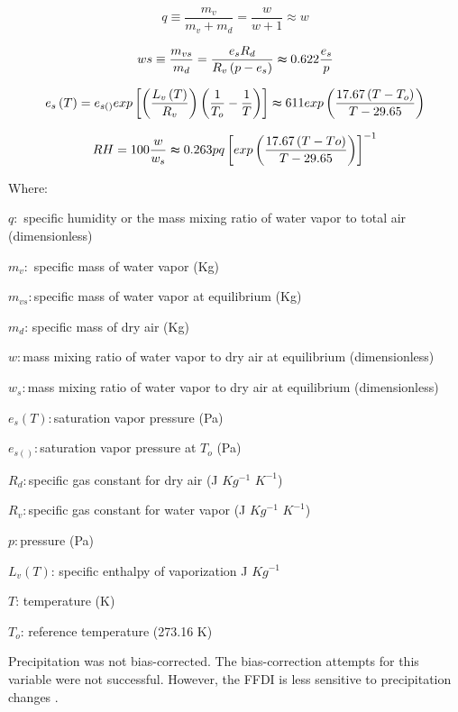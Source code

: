 \begin{equation}
q\equiv\frac{m_{v}}{m_{v}+m_{d}}=\frac{w}{w+1}\approx w
\end{equation}


\begin{equation}
ws\equiv\frac{m_{vs}}{m_{d}}=\frac{e_{s}R_{d}}{R_{v}\left(p-e_{s}\right)}\thickapprox0.622\frac{e_{s}}{p}
\end{equation}


\begin{equation}
e_{s}\left(T\right)=e_{s()}exp\left[\left(\frac{L_{v}\left(T\right)}{R_{v}}\right)\left(\frac{1}{T_{o}}-\frac{1}{T}\right)\right]\thickapprox611exp\left(\frac{17.67\left(T-T_{o}\right)}{T-29.65}\right)
\end{equation}


\begin{equation}
RH=100\frac{w}{w_{s}}\thickapprox0.263pq\left[exp\left(\frac{17.67\left(T-To\right)}{T-29.65}\right)\right]^{-1}
\end{equation}


Where:

$q:$ specific humidity or the mass mixing ratio of water vapor to
total air (dimensionless)

$m_{v}:$ specific mass of water vapor (Kg)

$m_{vs}:$specific mass of water vapor at equilibrium (Kg)

$m_{d}$: specific mass of dry air (Kg)

$w:$mass mixing ratio of water vapor to dry air at equilibrium (dimensionless)

$w_{s}:$mass mixing ratio of water vapor to dry air at equilibrium
(dimensionless)

$e_{s}(T):$saturation vapor pressure (Pa)

$e_{s()}:$saturation vapor pressure at $T_{o}$ (Pa)

$R_{d}:$specific gas constant for dry air (J $Kg^{-1}$ $K^{-1}$)

$R_{v}:$specific gas constant for water vapor (J $Kg^{-1}$ $K^{-1}$)

$p:$pressure (Pa)

$L_{v}(T)$: specific enthalpy of vaporization J $Kg^{-1}$

$T$: temperature (K)

$T_{o}$: reference temperature (273.16 K)

Precipitation was not bias-corrected. The bias-correction attempts
for this variable were not successful. However, the FFDI is less sensitive
to precipitation changes \citep{Dowdy2009}. 


